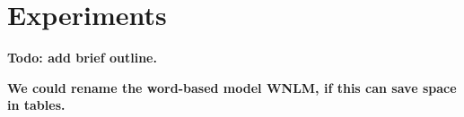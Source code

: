 \section{Experiments}
\label{sec:experiments}

\textbf{Todo: add brief outline.}

\textbf{We could rename the word-based model WNLM, if this can save space in tables.}












